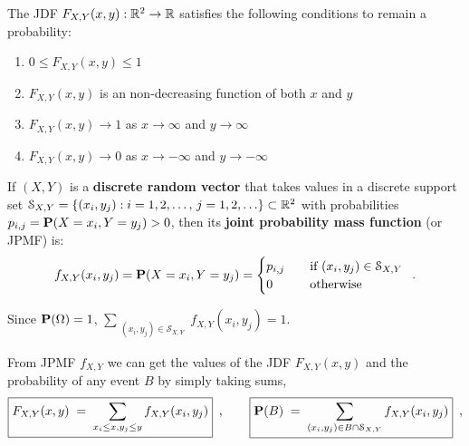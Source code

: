 The JDF $F_{X,Y}(x,y):\mathbb{R}^2\to\mathbb{R}$ satisfies the following conditions to remain a probability: 
\begin{enumerate}
\item $0 \leq F_{X,Y}(x,y) \leq 1$
\item $F_{X,Y}(x,y)$ is an non-decreasing function of both $x$ and $y$
\item $F_{X,Y}(x,y) \to 1$ as $x\to \infty$ and $y\to \infty$
\item $F_{X,Y}(x,y) \to 0$ as $x\to -\infty$ and $y\to -\infty$
\end{enumerate}

\begin{definition}[JPMF]
If $(X,Y)$ is a {\bf discrete random vector} that takes values in a discrete support set $\mathcal{S}_{X,Y} = \{(x_i,y_j): i=1,2,\ldots, \, j=1,2,\ldots\} \subset \mathbb{R}^2$ with probabilities $p_{i,j}=\mathbf{P}(X=x_i,Y=y_j)>0$, then its \textbf{joint probability mass function} (or JPMF) is:
\begin{equation}\label{Eq:j2DPMF}
f_{X,Y}(x_i,y_j) = \p(X=x_i,Y=y_j) %
=\begin{cases}
p_{i,j}&\quad \textrm{if } (x_i,y_j) \in \mathcal{S}_{X,Y}\\
0&\quad \textrm{otherwise}
\end{cases}  \enspace .
\end{equation}

Since $\mathbf{P}(\Omega)=1$, $\sum_{{\substack{(x_i,y_j) \in \mathcal{S}_{X,Y}}}}f_{X,Y}(x_i,y_j)=1$.
\end{definition}

From JPMF $f_{X,Y}$ we can get the values of the JDF $F_{X,Y}(x,y)$ and the probability of any event $B$ by simply taking sums,
\begin{equation}\label{Eq:2DiscretejDFFromjPMF}
\boxed{F_{X,Y}(x,y)\;=\;\sum_{x_i\leq x, y_j \leq y}f_{X,Y}(x_i,y_j) }\enspace ,
\qquad \boxed{\mathbf{P}(B)\;=\;\sum_{\substack{(x_i, y_j) \in B \cap \mathcal{S}_{X,Y}}}f_{X,Y}(x_i,y_j) }\enspace ,
\end{equation}


